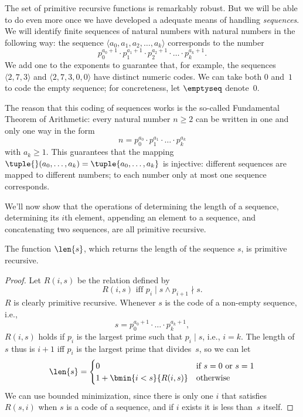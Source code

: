 \documentclass[../../../include/open-logic-section]{subfiles}
\begin{document}

The set of primitive recursive functions is remarkably robust. But we
will be able to do even more once we have developed a adequate means
of handling \emph{sequences}. We will identify finite sequences of
natural numbers with natural numbers in the following way: the
sequence $\langle a_0, a_1, a_2, \dots, a_k \rangle$ corresponds to
the number
\[
p_0^{a_0+1} \cdot p_1^{a_1+1} \cdot p_2^{a_2+1} \cdot \dots \cdot
p_k^{a_k+1}.
\]
We add one to the exponents to guarantee that, for example, the
sequences $\langle 2, 7, 3\rangle$ and $\langle 2, 7, 3, 0, 0 \rangle$
have distinct numeric codes. We can take both $0$ and~$1$ to code the
empty sequence; for concreteness, let $\emptyseq$ denote~$0$.

The reason that this coding of sequences works is the so-called
Fundamental Theorem of Arithmetic: every natural number $n \ge 2$ can
be written in one and only one way in the form
\[
n = p_0^{a_0} \cdot p_1^{a_1} \cdot \dots \cdot p_k^{a_k}
\]
with $a_k \ge 1$. This guarantees that the mapping $\tuple{}(a_0,
\dots, a_k) = \tuple{a_0, \dots, a_k}$ is injective: different
sequences are mapped to different numbers; to each number only at most
one sequence corresponds.

We'll now show that the operations of determining the length of a
sequence, determining its $i$th element, appending an element to a
sequence, and concatenating two sequences, are all primitive
recursive.

\begin{prop}
  The function $\len{s}$, which returns the length of the sequence
  $s$, is primitive recursive.
\end{prop}

\begin{proof}
  Let $R(i, s)$ be the relation defined by
  \[
  R(i, s) \text{ iff }
  p_i \mid s \land p_{i+1} \nmid s.
  \]
  $R$ is clearly primitive recursive. Whenever $s$ is the code of a
  non-empty sequence, i.e.,
  \[
  s = p_0^{a_0+1} \cdot \dots \cdot p_{k}^{a_{k}+1},
  \]
  $R(i,s)$ holds if $p_i$ is the largest prime such that
  $p_i \mid s$, i.e., $i = k$. The length of $s$ thus is $i+1$ iff
  $p_i$ is the largest prime that divides~$s$, so we can let
  \[
  \len{s} =
  \begin{cases}
    0 & \text{if $s = 0$ or $s = 1$} \\
    1 + \bmin{i < s}{R(i, s)} & \text{otherwise}
  \end{cases}
  \]
  We can use bounded minimization, since there is only one $i$ that
  satisfies $R(s, i)$ when $s$ is a code of a sequence, and if $i$
  exists it is less than~$s$ itself.
\end{proof}
\end{document}

